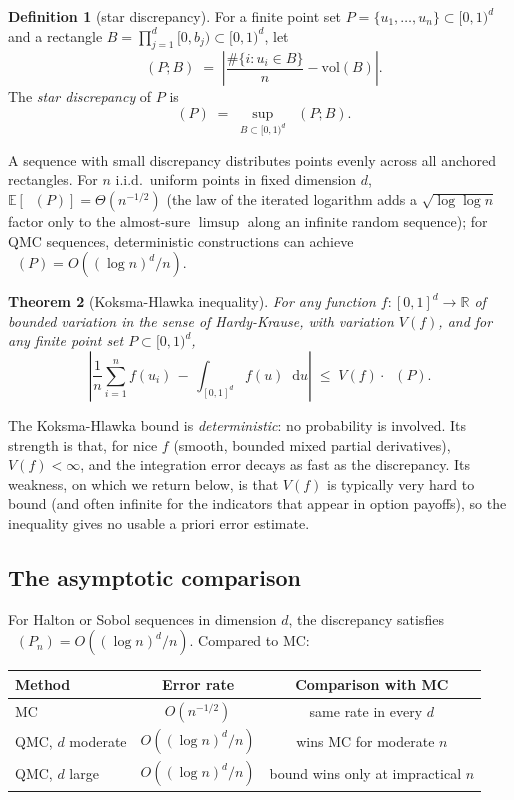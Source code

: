\documentclass[11pt,a4paper]{article}
\theoremstyle{plain}
\newtheorem{theorem}{Theorem}[section]
\theoremstyle{definition}
\newtheorem{definition}[theorem]{Definition}
\theoremstyle{remark}
\newcommand{\R}{\mathbb{R}}
\newcommand{\E}{\mathbb{E}}
\newcommand{\dd}{\mathop{}\!\mathrm{d}}
\DeclareMathOperator{\Disc}{D^*}
\begin{document}
\begin{definition}[star discrepancy]
\label{def:discrepancy}
For a finite point set $P = \{u_1, \ldots, u_n\} \subset [0,1)^d$
and a rectangle $B = \prod_{j=1}^d [0, b_j) \subset [0, 1)^d$, let
\begin{equation}
\Disc(P; B) \;=\; \left| \frac{\#\{i : u_i \in B\}}{n} -
                         \mathrm{vol}(B) \right|.
\end{equation}
The \emph{star discrepancy} of $P$ is
\begin{equation}
\Disc(P) \;=\; \sup_{B \subset [0,1)^d} \Disc(P; B).
\end{equation}
\end{definition}

A sequence with small discrepancy distributes points evenly across
all anchored rectangles. For $n$ i.i.d.\ uniform points in fixed
dimension $d$, $\E[\Disc(P)] = \Theta(n^{-1/2})$ (the law of the
iterated logarithm adds a $\sqrt{\log \log n}$ factor only to the
almost-sure $\limsup$ along an infinite random sequence); for QMC
sequences, deterministic constructions can achieve $\Disc(P) =
O((\log n)^d / n)$.

\begin{theorem}[Koksma-Hlawka inequality]
\label{thm:kh}
For any function $f : [0,1]^d \to \R$ of bounded variation in the
sense of Hardy-Krause, with variation $V(f)$, and for any finite
point set $P \subset [0, 1)^d$,
\begin{equation}
\left| \frac{1}{n} \sum_{i=1}^n f(u_i)
       \,-\, \int_{[0,1]^d} f(u) \dd u \right|
\;\leq\; V(f) \cdot \Disc(P).
\end{equation}
\end{theorem}

The Koksma-Hlawka bound is \emph{deterministic}: no probability is
involved. Its strength is that, for nice $f$ (smooth, bounded
mixed partial derivatives), $V(f) < \infty$, and the integration
error decays as fast as the discrepancy. Its weakness, on which we
return below, is that $V(f)$ is typically very hard to bound (and
often infinite for the indicators that appear in option payoffs),
so the inequality gives no usable a priori error estimate.

\subsection{The asymptotic comparison}

For Halton or Sobol sequences in dimension $d$, the discrepancy
satisfies $\Disc(P_n) = O((\log n)^d / n)$. Compared to MC:
\begin{center}
\begin{tabular}{l c c}
Method & Error rate & Comparison with MC \\
\hline
MC                & $O(n^{-1/2})$         & same rate in every $d$ \\
QMC, $d$ moderate & $O((\log n)^d / n)$  & wins MC for moderate $n$ \\
QMC, $d$ large    & $O((\log n)^d / n)$  & bound wins only at impractical $n$
\end{tabular}
\end{center}
\end{document}

